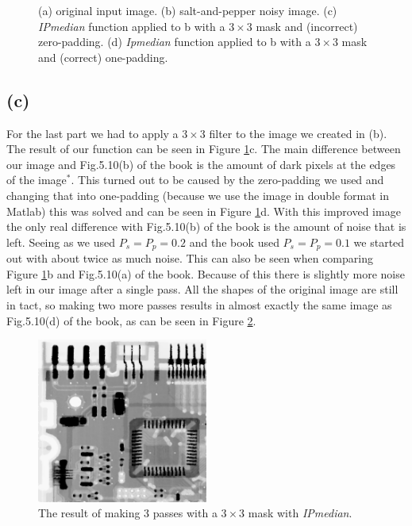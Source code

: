 \documentclass{article}
\begin{document}
\begin{figure}[h]
    \centering
    
    \caption{(a) original input image. (b) salt-and-pepper noisy image. (c) \textit{IPmedian} function applied to b with a $3 \times 3$ mask and (incorrect) zero-padding. (d) \textit{Ipmedian} function applied to b with a $3 \times 3$ mask and (correct) one-padding.}
    \label{fig:IPmedian}
\end{figure}

\subsection*{(c)}
For the last part we had to apply a $3 \times 3$ filter to the image we created in (b). The result of our function can be seen in Figure \ref{fig:IPmedian}c. The main difference between our image and Fig.5.10(b) of the book is the amount of dark pixels at the edges of the image$^*$. This turned out to be caused by the zero-padding we used and changing that into one-padding (because we use the image in double format in Matlab) this was solved and can be seen in Figure \ref{fig:IPmedian}d. With this improved image the only real difference with Fig.5.10(b) of the book is the amount of noise that is left. Seeing as we used $P_s = P_p = 0.2$ and the book used $P_s = P_p = 0.1$ we started out with about twice as much noise. This can also be seen when comparing Figure \ref{fig:IPmedian}b and Fig.5.10(a) of the book. Because of this there is slightly more noise left in our image after a single pass. All the shapes of the original image are still in tact, so making two more passes results in almost exactly the same image as Fig.5.10(d) of the book, as can be seen in Figure \ref{fig:IPmedian3pass}.

\begin{figure}[h]
    \centering
    \includegraphics[width=0.5\textwidth]{Assignment_2/output_plots/multipassFilteredImage.png}
    \caption{The result of making 3 passes with a $3 \times 3$ mask with \textit{IPmedian}.}
    \label{fig:IPmedian3pass}
\end{figure}
\end{document}
